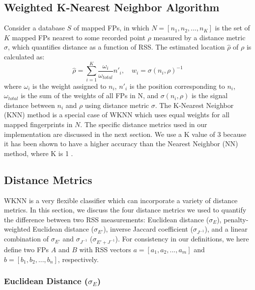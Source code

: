 \documentclass[conference]{IEEEtran}
\begin{document}
\subsection{Weighted K-Nearest Neighbor Algorithm}
\indent Consider a database $S$ of mapped FPs, in which $N=[n_1, n_2, ..., n_K]$ is the set of $K$ mapped FPs nearest to some recorded point $\rho$ measured by a distance metric $\sigma$, which quantifies distance as a function of RSS. The estimated location $\hat{\rho}$ of $\rho$ is calculated as:
\begin{equation}
\label{eq:wknn}
\hat{\rho} = \sum\limits_{i=1}^{K}\frac{\omega_i}{\omega_{total}}n'_i, \quad w_i = \sigma(n_i, \rho)^{-1}
\end{equation}
where $\omega_i$ is the weight assigned to $n_i$, $n'_i$ is the position corresponding to $n_i$, $\omega_{total}$ is the sum of the weights of all FPs in N, and $\sigma(n_i, \rho)$ is the signal distance between $n_i$ and $\rho$ using distance metric $\sigma$. The K-Nearest Neighbor (KNN) method is a special case of WKNN which uses equal weights for all mapped fingerprints in $N$. The specific distance metrics used in our implementation are discussed in the next section. We use a K value of 3 because it has been shown to have a higher accuracy than the Nearest Neighbor (NN) method, where K is 1 \cite{Kokkinis}. 

\subsection{Distance Metrics}\label{subsec:distance_metrics}
WKNN is a very flexible classifier which can incorporate a variety of distance metrics. In this section, we discuss the four distance metrics we used to quantify the difference between two RSS measurements: Euclidean distance ($\sigma_E$), penalty-weighted Euclidean distance ($\sigma_{E'}$), inverse Jaccard coefficient ($\sigma_{J^{-1}}$), and a linear combination of $\sigma_{E'}$ and $\sigma_{J^{-1}}$ ($\sigma_{E' + J^{-1}}$). For consistency in our definitions, we here define two FPs $A$ and $B$ with RSS vectors $a=[a_1, a_2, ... , a_m]$ and $b=[b_1, b_2, ... , b_n]$, respectively. 

\subsubsection{Euclidean Distance ($\sigma_E$)}
\end{document}
